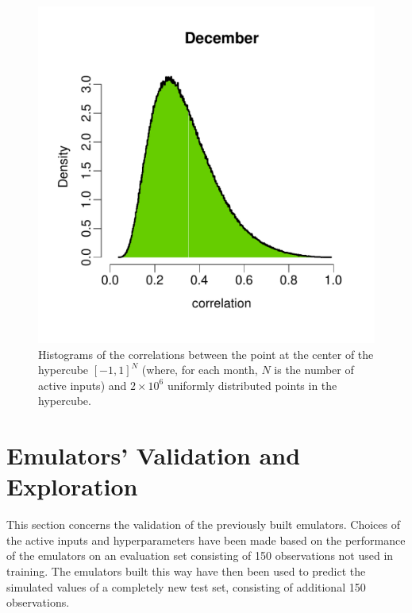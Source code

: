 \documentclass[a4paper, 12pt]{article}
\begin{document}
\begin{figure}
 \includegraphics[width=\scale]{Validation_Plots/Correlation/Correlation_12_Dec}
 \caption{Histograms of the correlations between the point at the center of the hypercube $[-1,1]^N$ (where, for each month, $N$ is the number of active inputs) and $2\times 10^6$ uniformly distributed points in the hypercube.}
 \label{Fig_Correlation}
\end{figure}



\section{Emulators' Validation and Exploration}\label{Validation}
This section concerns the validation of the previously built emulators. Choices of the active inputs and hyperparameters have been made based on the performance of the emulators on an evaluation set consisting of 150 observations not used in training. The emulators built this way have then been used to predict the simulated values of a completely new test set, consisting of additional 150 observations. 
\end{document}
